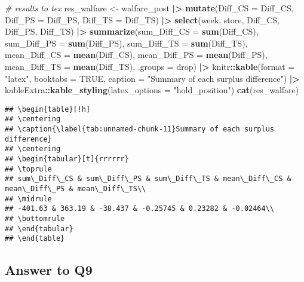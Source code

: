 \documentclass[
]{article}
\newenvironment{Shaded}{\begin{snugshade}}{\end{snugshade}}
\newcommand{\AttributeTok}[1]{\textcolor[rgb]{0.13,0.29,0.53}{#1}}
\newcommand{\CommentTok}[1]{\textcolor[rgb]{0.56,0.35,0.01}{\textit{#1}}}
\newcommand{\ConstantTok}[1]{\textcolor[rgb]{0.56,0.35,0.01}{#1}}
\newcommand{\FunctionTok}[1]{\textcolor[rgb]{0.13,0.29,0.53}{\textbf{#1}}}
\newcommand{\NormalTok}[1]{#1}
\newcommand{\OtherTok}[1]{\textcolor[rgb]{0.56,0.35,0.01}{#1}}
\newcommand{\SpecialCharTok}[1]{\textcolor[rgb]{0.81,0.36,0.00}{\textbf{#1}}}
\newcommand{\StringTok}[1]{\textcolor[rgb]{0.31,0.60,0.02}{#1}}
\begin{document}
\begin{Shaded}
\begin{Highlighting}[]
\CommentTok{\# results to tex}
\NormalTok{res\_walfare }\OtherTok{\textless{}{-}}\NormalTok{ walfare\_post }\SpecialCharTok{|\textgreater{}}
  \FunctionTok{mutate}\NormalTok{(}\AttributeTok{Diff\_CS =}\NormalTok{ Diff\_CS, }\AttributeTok{Diff\_PS =}\NormalTok{ Diff\_PS, }\AttributeTok{Diff\_TS =}\NormalTok{ Diff\_TS) }\SpecialCharTok{|\textgreater{}}
  \FunctionTok{select}\NormalTok{(week, store, Diff\_CS, Diff\_PS, Diff\_TS) }\SpecialCharTok{|\textgreater{}}
  \FunctionTok{summarize}\NormalTok{(}\AttributeTok{sum\_Diff\_CS =} \FunctionTok{sum}\NormalTok{(Diff\_CS), }\AttributeTok{sum\_Diff\_PS =} \FunctionTok{sum}\NormalTok{(Diff\_PS), }\AttributeTok{sum\_Diff\_TS =} \FunctionTok{sum}\NormalTok{(Diff\_TS), }
            \AttributeTok{mean\_Diff\_CS =} \FunctionTok{mean}\NormalTok{(Diff\_CS), }\AttributeTok{mean\_Diff\_PS =} \FunctionTok{mean}\NormalTok{(Diff\_PS), }\AttributeTok{mean\_Diff\_TS =} \FunctionTok{mean}\NormalTok{(Diff\_TS), }
            \AttributeTok{.groups =} \StringTok{\textquotesingle{}drop\textquotesingle{}}\NormalTok{) }\SpecialCharTok{|\textgreater{}}
\NormalTok{  knitr}\SpecialCharTok{::}\FunctionTok{kable}\NormalTok{(}\AttributeTok{format =} \StringTok{"latex"}\NormalTok{, }\AttributeTok{booktabs =} \ConstantTok{TRUE}\NormalTok{, }
               \AttributeTok{caption =} \StringTok{"Summary of each surplus difference"}\NormalTok{) }\SpecialCharTok{|\textgreater{}}
\NormalTok{  kableExtra}\SpecialCharTok{::}\FunctionTok{kable\_styling}\NormalTok{(}\AttributeTok{latex\_options =} \StringTok{"hold\_position"}\NormalTok{)}
\FunctionTok{cat}\NormalTok{(res\_walfare)}
\end{Highlighting}
\end{Shaded}

\begin{verbatim}
## \begin{table}[!h]
## \centering
## \caption{\label{tab:unnamed-chunk-11}Summary of each surplus difference}
## \centering
## \begin{tabular}[t]{rrrrrr}
## \toprule
## sum\_Diff\_CS & sum\_Diff\_PS & sum\_Diff\_TS & mean\_Diff\_CS & mean\_Diff\_PS & mean\_Diff\_TS\\
## \midrule
## -401.63 & 363.19 & -38.437 & -0.25745 & 0.23282 & -0.02464\\
## \bottomrule
## \end{tabular}
## \end{table}
\end{verbatim}

\hypertarget{answer-to-q9}{%
\subsection{Answer to Q9}\label{answer-to-q9}}
\end{document}
